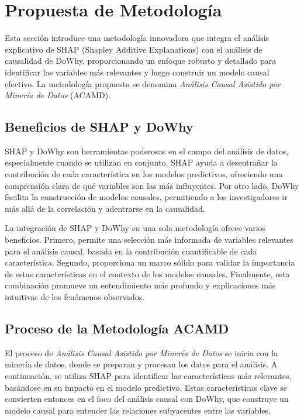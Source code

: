 \section{Propuesta de Metodología}\label{sec:propuesta-metodologia}

Esta sección introduce una metodología innovadora que integra el análisis explicativo de SHAP (Shapley Additive Explanations) con el análisis de causalidad de DoWhy, proporcionando un enfoque robusto y detallado para identificar las variables más relevantes y luego construir un modelo causal efectivo. La metodología propuesta se denomina \textit{Análisis Causal Asistido por Minería de Datos} (ACAMD).

\subsection{Beneficios de SHAP y DoWhy}\label{subsec:beneficios-shap-dowhy}

SHAP y DoWhy son herramientas poderosas en el campo del análisis de datos, especialmente cuando se utilizan en conjunto. SHAP ayuda a desentrañar la contribución de cada característica en los modelos predictivos, ofreciendo una comprensión clara de qué variables son las más influyentes. Por otro lado, DoWhy facilita la construcción de modelos causales, permitiendo a los investigadores ir más allá de la correlación y adentrarse en la causalidad.

La integración de SHAP y DoWhy en una sola metodología ofrece varios beneficios. Primero, permite una selección más informada de variables relevantes para el análisis causal, basada en la contribución cuantificable de cada característica. Segundo, proporciona un marco sólido para validar la importancia de estas características en el contexto de los modelos causales. Finalmente, esta combinación promueve un entendimiento más profundo y explicaciones más intuitivas de los fenómenos observados.

\subsection{Proceso de la Metodología ACAMD}\label{subsec:proceso-metodologia}

El proceso de \textit{Análisis Causal Asistido por Minería de Datos} se inicia con la minería de datos, donde se preparan y procesan los datos para el análisis. A continuación, se utiliza SHAP para identificar las características más relevantes, basándose en su impacto en el modelo predictivo. Estas características clave se convierten entonces en el foco del análisis causal con DoWhy, que construye un modelo causal para entender las relaciones subyacentes entre las variables.

